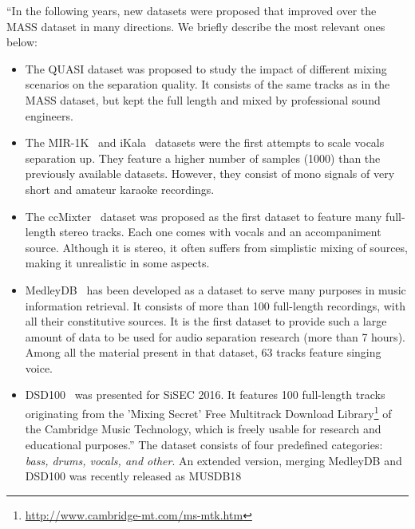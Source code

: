 ``In the following years, new datasets were proposed that improved over the MASS dataset in many directions. 
We briefly describe the most relevant ones below:

\begin{itemize}[leftmargin=*]
    \item The QUASI dataset was proposed to study the impact of different mixing scenarios on the separation quality. It consists of the same tracks as in the MASS dataset, but kept the full length and mixed by professional sound engineers.
    \item The MIR-1K~\cite{hsu10} and iKala~\cite{chan15} datasets were the first attempts to scale vocals separation up. They feature a higher number of samples (1000) than the previously available datasets. However, they consist of mono signals of very short and amateur karaoke recordings.
    \item The ccMixter~\cite{liutkus142} dataset was proposed as the first dataset to feature many full-length stereo tracks. Each one comes with vocals and an accompaniment source. Although it is stereo, it often suffers from simplistic mixing of sources, making it unrealistic in some aspects.
    \item MedleyDB~\cite{bittner14} has been developed as a dataset to serve many purposes in music information retrieval. It consists of more than 100 full-length recordings, with all their constitutive sources. It is the first dataset to provide such a large amount of data to be used for audio separation research (more than 7 hours). Among all the material present in that dataset, 63 tracks feature singing voice.
    \item DSD100~\cite{liutkus17} was presented for SiSEC 2016. It features 100 full-length tracks originating from the 'Mixing Secret' Free Multitrack Download Library\footnote{\url{http://www.cambridge-mt.com/ms-mtk.htm}} of the Cambridge Music Technology, which is freely usable for research and educational purposes.''
    The dataset consists of four predefined categories: \emph{bass, drums, vocals, and other}. An extended version, merging MedleyDB and DSD100 was recently released as MUSDB18~\cite{rafii17, stoeter18sisec}
\end{itemize}


